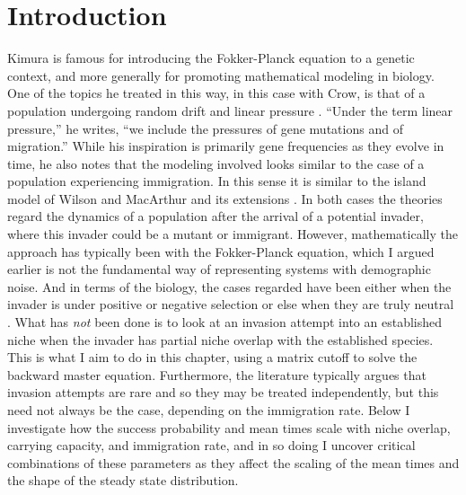 \section{Introduction}
Kimura is famous for introducing the Fokker-Planck equation to a genetic context, and more generally for promoting mathematical modeling in biology. 
One of the topics he treated in this way, in this case with Crow, is that of a population undergoing random drift and linear pressure \cite{Crow1956,Kimura1964}. 
``Under the term linear pressure,'' he writes, ``we include the pressures of gene mutations and of migration.'' 
While his inspiration is primarily gene frequencies as they evolve in time, he also notes that the modeling involved looks similar to the case of a population experiencing immigration. 
In this sense it is similar to the island model of Wilson and MacArthur  and its extensions \cite{MacArthur2001,Hubbell2001,Kessler2015}. %
In both cases the theories regard the dynamics of a population after the arrival of a potential invader, where this invader could be a mutant or immigrant. 
However, mathematically the approach has typically been with the Fokker-Planck equation, which I argued earlier is not the fundamental way of representing systems with demographic noise. %
And in terms of the biology, the cases regarded have been either when the invader is under positive or negative selection \cite{Kimura1955} or else when they are truly neutral \cite{Kimura1956,Hubbell2001}. %
What has \emph{not} been done is to look at an invasion attempt into an established niche when the invader has partial niche overlap with the established species. 
This is what I aim to do in this chapter, using a matrix cutoff to solve the backward master equation. 
Furthermore, the literature typically argues that invasion attempts are rare and so they may be treated independently, but this need not always be the case, depending on the immigration rate. %
Below I investigate how the success probability and mean times scale with niche overlap, carrying capacity, and immigration rate, and in so doing I uncover critical combinations of these parameters as they affect the scaling of the mean times and the shape of the steady state distribution. 
